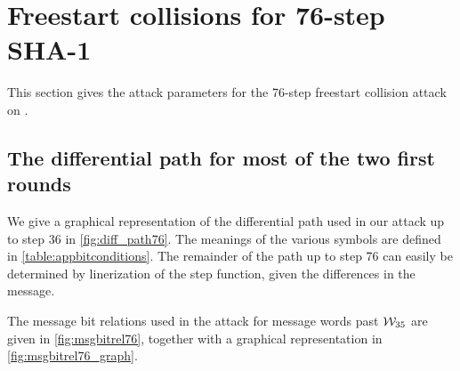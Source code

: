 \section{Freestart collisions for 76-step SHA-1}
\label{sec:res_76}

This section gives the attack parameters for the 76-step freestart collision attack on \shaone.

\subsection{The differential path for most of the two first rounds}
\label{sec:app_diff_path76}

We give a graphical representation of the differential path
used in our attack up to step 36 in \autoref{fig:diff_path76}.
The meanings of the various symbols are defined
in \autoref{table:appbitconditions}.
The remainder of the path up to step 76 can easily
be determined by linerization of the step function, given the differences
in the message.

The message bit relations used in the attack for message words past $\mathcal{W}_{35}$ are given in \autoref{fig:msgbitrel76}, together with a
graphical representation in \autoref{fig:msgbitrel76_graph}.

